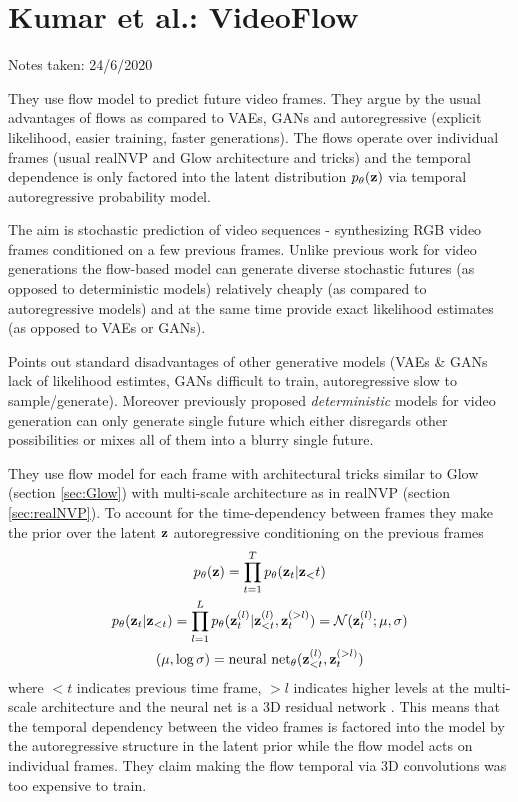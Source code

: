 \clearpage 

\section{Kumar et al.: VideoFlow}\label{sec:videoFlow}

\begin{notebox}

\hfill Notes taken: 24/6/2020 
\end{notebox}

\begin{notebox}
\tldr They use flow model to predict future video frames. They argue by the usual advantages of flows as compared to VAEs, GANs and autoregressive (explicit likelihood, easier training, faster generations). The flows operate over individual frames (usual realNVP and Glow architecture and tricks) and the temporal dependence is only factored into the latent distribution $p_{\theta}(\mathbf{z})$ via temporal autoregressive probability model. 
\end{notebox}

The aim is stochastic prediction of video sequences - synthesizing RGB video frames conditioned on a few previous frames. Unlike previous work for video generations the flow-based model can generate diverse stochastic futures (as opposed to deterministic models) relatively cheaply (as compared to autoregressive models) and at the same time provide exact likelihood estimates (as opposed to VAEs or GANs).

Points out standard disadvantages of other generative models (VAEs \& GANs lack of likelihood estimtes, GANs difficult to train, autoregressive slow to sample/generate). Moreover previously proposed \emph{deterministic} models for video generation can only generate single future which either disregards other possibilities or mixes all of them into a blurry single future.

They use flow model for each frame with architectural tricks similar to Glow (section \ref{sec:Glow}) with multi-scale architecture as in realNVP (section \ref{sec:realNVP}). To account for the time-dependency between frames they make the prior over the latent $\mathbf{z}$ autoregressive conditioning on the previous frames
\begin{gather}
p_\theta(\mathbf{z}) = \prod_{t=1}^T p_\theta(\mathbf{z}_t | \mathbf{z}_<t) \\
p_\theta(\mathbf{z}_t | \mathbf{z}_{<t}) = \prod_{l=1}^L p_\theta(\mathbf{z}_t^{(l)} | \mathbf{z}_{<t}^{(l)}, \mathbf{z}_t^{(>l)}) = \mathcal{N}(\mathbf{z}_t^{(l)} ; \mu, \sigma) \\
(\mu, \log \sigma) = \text{neural net}_\theta(\mathbf{z}_{<t}^{(l)}, \mathbf{z}_t^{(>l)})
\end{gather}
where $<t$ indicates previous time frame, $>l$ indicates higher levels at the multi-scale architecture and the neural net is a 3D residual network .
This means that the temporal dependency between the video frames is factored into the model by the autoregressive structure in the latent prior while the flow model acts on individual frames. They claim making the flow temporal via 3D convolutions was too expensive to train.

